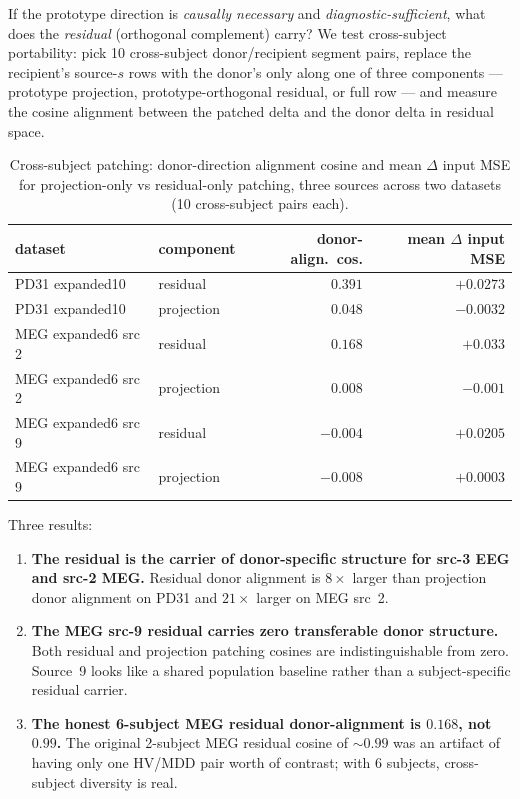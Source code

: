 \documentclass[11pt]{article}
\newcommand{\dmse}{$\Delta$ input MSE}
\begin{document}
If the prototype direction is \emph{causally necessary} and
\emph{diagnostic-sufficient}, what does the \emph{residual} (orthogonal
complement) carry? We test cross-subject portability: pick 10 cross-subject
donor/recipient segment pairs, replace the recipient's source-$s$ rows with
the donor's only along one of three components --- prototype projection,
prototype-orthogonal residual, or full row --- and measure the cosine
alignment between the patched delta and the donor delta in residual space.

\begin{table}[h]
\centering
\small
\begin{tabular}{llrr}
\toprule
\textbf{dataset} & \textbf{component} & \textbf{donor-align.\ cos.} & \textbf{mean \dmse{}} \\
\midrule
PD31 expanded10        & residual    & $\mathbf{0.391}$ & $+0.0273$ \\
PD31 expanded10        & projection  & $0.048$          & $-0.0032$ \\
MEG expanded6 src 2    & residual    & $\mathbf{0.168}$ & $+0.033$  \\
MEG expanded6 src 2    & projection  & $0.008$          & $-0.001$  \\
MEG expanded6 src 9    & residual    & $\mathbf{-0.004}$ & $+0.0205$ \\
MEG expanded6 src 9    & projection  & $-0.008$          & $+0.0003$ \\
\bottomrule
\end{tabular}
\caption{Cross-subject patching: donor-direction alignment cosine and mean
$\Delta$ input MSE for projection-only vs residual-only patching, three
sources across two datasets (10 cross-subject pairs each).
\label{tab:patching}}
\end{table}

Three results:
\begin{enumerate}[leftmargin=1.4em,itemsep=0.2em,topsep=0.3em]
\item \textbf{The residual is the carrier of donor-specific structure for
src-3 EEG and src-2 MEG.} Residual donor alignment is $8\times$ larger than
projection donor alignment on PD31 and $21\times$ larger on MEG src~2.
\item \textbf{The MEG src-9 residual carries zero transferable donor
structure.} Both residual and projection patching cosines are
indistinguishable from zero. Source~9 looks like a shared population
baseline rather than a subject-specific residual carrier.
\item \textbf{The honest 6-subject MEG residual donor-alignment is $0.168$,
not $0.99$.} The original 2-subject MEG residual cosine of $\sim 0.99$ was an
artifact of having only one HV/MDD pair worth of contrast; with 6 subjects,
cross-subject diversity is real.
\end{enumerate}
\end{document}
